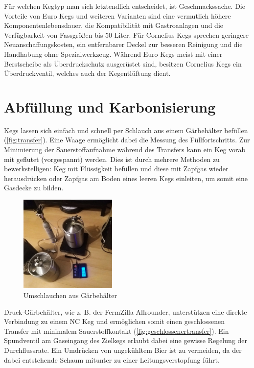 \documentclass[a4paper,parskip=half]{scrartcl}
\begin{document}
Für welchen Kegtyp man sich letztendlich entscheidet, ist Geschmackssache. Die Vorteile von Euro Kegs und weiteren Varianten sind eine vermutlich höhere Komponentenlebensdauer, die Kompatibilität mit Gastroanlagen und die Verfügbarkeit von Fassgrößen bis 50 Liter. Für Cornelius Kegs sprechen geringere Neuanschaffungskosten, ein entfernbarer Deckel zur besseren Reinigung und die Handhabung ohne Spezialwerkzeug. Während Euro Kegs meist mit einer Berstscheibe als Überdruckschutz ausgerüstet sind, besitzen Cornelius Kegs ein Überdruckventil, welches auch der Kegentlüftung dient.

\section*{Abfüllung und Karbonisierung}

Kegs lassen sich einfach und schnell per Schlauch aus einem Gärbehälter befüllen (\autoref{fig:transfer}). Eine Waage ermöglicht dabei die Messung des Füllfortschritts. Zur Minimierung der Sauerstoffaufnahme während des Transfers kann ein Keg vorab mit  geflutet (vorgespannt) werden. Dies ist durch mehrere Methoden zu bewerkstelligen: Keg mit Flüssigkeit befüllen und diese mit Zapfgas wieder herausdrücken oder Zapfgas am Boden eines leeren Kegs einleiten, um somit eine Gasdecke zu bilden.

\begin{figure}[h]
\centering
\includegraphics[width=4.8cm]{images/transfer.jpg}
\caption{Umschlauchen aus Gärbehälter}
\label{fig:transfer}
\end{figure}

Druck-Gärbehälter, wie z. B. der FermZilla Allrounder, unterstützen eine direkte Verbindung zu einem NC Keg und ermöglichen somit einen geschlossenen Transfer mit minimalem Sauerstoffkontakt (\autoref{fig:geschlossenertransfer}). Ein Spundventil am Gaseingang des Zielkegs erlaubt dabei eine gewisse Regelung der Durchflussrate. Ein Umdrücken von ungekühltem Bier ist zu vermeiden, da der dabei entstehende Schaum mitunter zu einer Leitungsverstopfung führt.
\end{document}
